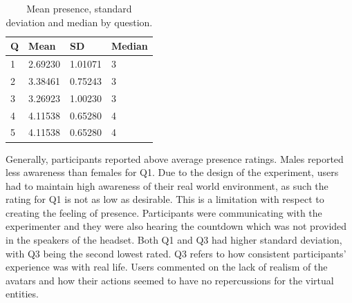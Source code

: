\begin{table}[H]
\centering
\begin{tabular}{|llll|}
\hline
Q & Mean & SD & Median \\
\hline
1 &  2.69230 & 1.01071&3\\  
2 &  3.38461 & 0.75243&3\\ 
3 &  3.26923 & 1.00230&3\\ 
4 &  4.11538 & 0.65280&4\\  
5 &  4.11538 & 0.65280&4\\  
\hline
\end{tabular}
\caption{Mean presence, standard deviation and median by question.}
\label{tbl:pres}
\end{table} 
Generally, participants reported above average presence ratings. Males reported less awareness than females for Q1. Due to the design of the experiment, users had to maintain high awareness of their real world environment, as such the rating for Q1 is not as low as desirable. This is a limitation with respect to creating the feeling of presence. Participants were communicating with the experimenter and they were also hearing the countdown which was not provided in the speakers of the headset. Both Q1 and Q3 had higher standard deviation, with Q3 being the second lowest rated. Q3 refers to how consistent participants' experience was with real life. Users commented on the lack of realism of the avatars and how their actions seemed to have no repercussions for the virtual entities. \\

\clearpage

